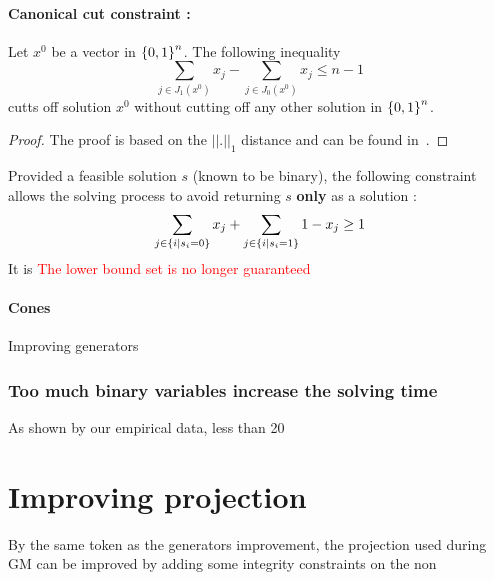 \paragraph*{Canonical cut constraint :}
\begin{proposition}
    Let $x^0$ be a vector in $\left\lbrace 0,1 \right\rbrace^n$. The following inequality
    \begin{equation}
        \sum_{j\in J_1(x^0)} x_j - \sum_{j \in J_0(x^0)} x_ j \leq n - 1
    \end{equation}
    cutts off solution $x^0$ without cutting off any other solution in $\left\lbrace 0,1 \right\rbrace^n$.
\end{proposition}
\begin{proof}
    The proof is based on the $||.||_1$ distance and can be found in~\cite{Hanafi2011}.
\end{proof}
\begin{proposition}
    
\end{proposition}

Provided a feasible solution $s$ (known to be binary), the following constraint allows the solving process to avoid returning $s$ \textbf{only} as a solution \cite{canonical_cut}:
\[
\sum_{j \in \left\lbrace i \mid s_i = 0 \right\rbrace}x_j +  \sum_{j \in \left\lbrace i \mid s_i = 1 \right\rbrace}1-x_j \geq 1
\]
It is 
\textcolor{red}{The lower bound set is no longer guaranteed}
\paragraph{Cones}

\begin{algorithm}
\caption{Improving generators}\label{alg:Generators_improvement}
\end{algorithm}
\subsubsection{Too much binary variables increase the solving time}
As shown by our empirical data, less than 20

\section{Improving projection}
By the same token as the generators improvement, the projection used during GM can be improved by adding some integrity constraints on the non 

